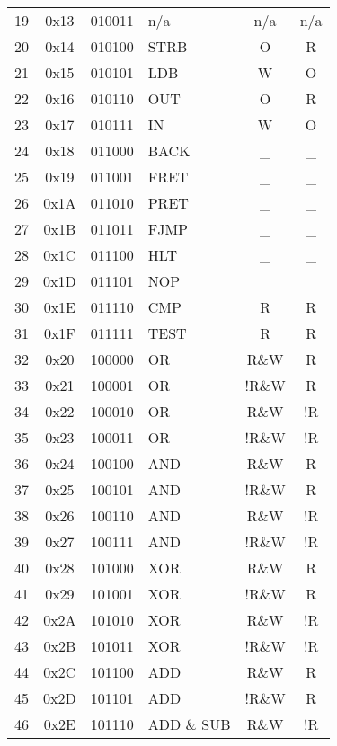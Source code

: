 \documentclass[oneside, a4paper]{memoir}
\begin{document}
\begin{center}
\begin{longtable}{ccclcc}
19 & 0x13 & 010011 & n/a             & n/a   & n/a \\
20 & 0x14 & 010100 & STRB            & O     & R   \\
21 & 0x15 & 010101 & LDB             & W     & O   \\
22 & 0x16 & 010110 & OUT             & O     & R   \\
23 & 0x17 & 010111 & IN              & W     & O   \\
24 & 0x18 & 011000 & BACK            & \_    & \_  \\
25 & 0x19 & 011001 & FRET            & \_    & \_  \\
26 & 0x1A & 011010 & PRET            & \_    & \_  \\
27 & 0x1B & 011011 & FJMP            & \_    & \_  \\
28 & 0x1C & 011100 & HLT             & \_    & \_  \\
29 & 0x1D & 011101 & NOP             & \_    & \_  \\
30 & 0x1E & 011110 & CMP             & R     & R   \\
31 & 0x1F & 011111 & TEST            & R     & R   \\
32 & 0x20 & 100000 & OR              & R\&W  & R   \\
33 & 0x21 & 100001 & OR              & !R\&W & R   \\
34 & 0x22 & 100010 & OR              & R\&W  & !R  \\
35 & 0x23 & 100011 & OR              & !R\&W & !R  \\
36 & 0x24 & 100100 & AND             & R\&W  & R   \\
37 & 0x25 & 100101 & AND             & !R\&W & R   \\
38 & 0x26 & 100110 & AND             & R\&W  & !R  \\
39 & 0x27 & 100111 & AND             & !R\&W & !R  \\
40 & 0x28 & 101000 & XOR             & R\&W  & R   \\
41 & 0x29 & 101001 & XOR             & !R\&W & R   \\
42 & 0x2A & 101010 & XOR             & R\&W  & !R  \\
43 & 0x2B & 101011 & XOR             & !R\&W & !R  \\
44 & 0x2C & 101100 & ADD             & R\&W  & R   \\
45 & 0x2D & 101101 & ADD             & !R\&W & R   \\
46 & 0x2E & 101110 & ADD   \& SUB    & R\&W  & !R  \\

\end{longtable}
\end{center}
\end{document}
